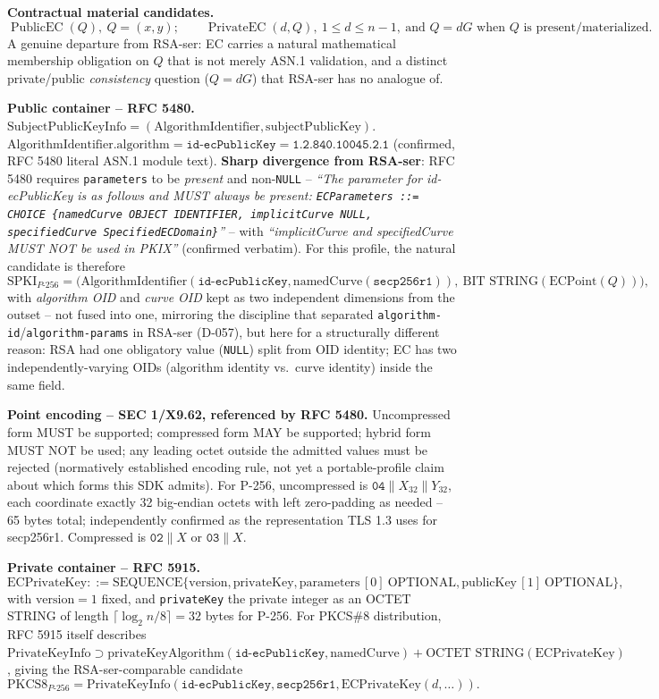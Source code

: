 \documentclass[11pt,a4paper]{article}
\begin{document}
\textbf{Contractual material candidates.}
\[
\operatorname{PublicEC}(Q),\ Q=(x,y); \qquad \operatorname{PrivateEC}(d,Q),\ 1\le d\le n-1,\ \text{and } Q=dG \text{ when } Q \text{ is present/materialized}.
\]
A genuine departure from RSA-ser: EC carries a natural mathematical membership obligation on $Q$ that is not merely ASN.1 validation, and a distinct private/public \emph{consistency} question ($Q=dG$) that RSA-ser has no analogue of.

\textbf{Public container -- RFC 5480.} $\text{SubjectPublicKeyInfo} = (\text{AlgorithmIdentifier}, \text{subjectPublicKey})$. $\text{AlgorithmIdentifier.algorithm} = \texttt{id-ecPublicKey} = \texttt{1.2.840.10045.2.1}$ (confirmed, RFC 5480 literal ASN.1 module text). \textbf{Sharp divergence from RSA-ser}: RFC 5480 requires \texttt{parameters} to be \emph{present} and non-\texttt{NULL} -- \emph{``The parameter for id-ecPublicKey is as follows and MUST always be present: \texttt{ECParameters ::= CHOICE \{namedCurve OBJECT IDENTIFIER, implicitCurve NULL, specifiedCurve SpecifiedECDomain\}}''} -- with \emph{``implicitCurve and specifiedCurve MUST NOT be used in PKIX''} (confirmed verbatim). For this profile, the natural candidate is therefore
\[
\text{SPKI}_{P\text{-}256} = \bigl(\text{AlgorithmIdentifier}(\texttt{id-ecPublicKey}, \text{namedCurve}(\texttt{secp256r1})),\ \text{BIT STRING}(\text{ECPoint}(Q))\bigr),
\]
with \emph{algorithm OID} and \emph{curve OID} kept as two independent dimensions from the outset -- not fused into one, mirroring the discipline that separated \texttt{algorithm-id}/\texttt{algorithm-params} in RSA-ser (D-057), but here for a structurally different reason: RSA had one obligatory value (\texttt{NULL}) split from OID identity; EC has two independently-varying OIDs (algorithm identity vs.\ curve identity) inside the same field.

\textbf{Point encoding -- SEC 1/X9.62, referenced by RFC 5480.} Uncompressed form MUST be supported; compressed form MAY be supported; hybrid form MUST NOT be used; any leading octet outside the admitted values must be rejected (normatively established encoding rule, not yet a portable-profile claim about which forms this SDK admits). For P-256, uncompressed is $\texttt{04}\|X_{32}\|Y_{32}$, each coordinate exactly 32 big-endian octets with left zero-padding as needed -- 65 bytes total; independently confirmed as the representation TLS 1.3 uses for secp256r1. Compressed is $\texttt{02}\|X$ or $\texttt{03}\|X$.

\textbf{Private container -- RFC 5915.}
\[
\text{ECPrivateKey} ::= \text{SEQUENCE}\{\text{version}, \text{privateKey}, \text{parameters}\,[0]\ \text{OPTIONAL}, \text{publicKey}\,[1]\ \text{OPTIONAL}\},
\]
with $\text{version}=1$ fixed, and \texttt{privateKey} the private integer as an OCTET STRING of length $\lceil \log_2 n / 8 \rceil = 32$ bytes for P-256. For PKCS\#8 distribution, RFC 5915 itself describes $\text{PrivateKeyInfo} \supset \text{privateKeyAlgorithm}(\texttt{id-ecPublicKey}, \text{namedCurve}) + \text{OCTET STRING}(\text{ECPrivateKey})$, giving the RSA-ser-comparable candidate
\[
\text{PKCS8}_{P\text{-}256} = \text{PrivateKeyInfo}(\texttt{id-ecPublicKey}, \texttt{secp256r1}, \text{ECPrivateKey}(d,\ldots)).
\]
\end{document}

